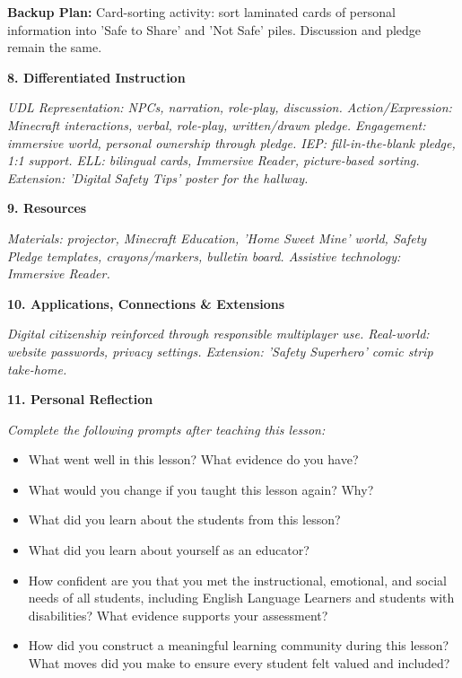 \documentclass[11pt,letterpaper]{article}
\begin{document}
\textbf{Backup Plan: }Card-sorting activity: sort laminated cards of personal information into 'Safe to Share' and 'Not Safe' piles. Discussion and pledge remain the same.

\textbf{8. Differentiated Instruction}

\textit{UDL Representation: NPCs, narration, role-play, discussion. Action/Expression: Minecraft interactions, verbal, role-play, written/drawn pledge. Engagement: immersive world, personal ownership through pledge. IEP: fill-in-the-blank pledge, 1:1 support. ELL: bilingual cards, Immersive Reader, picture-based sorting. Extension: 'Digital Safety Tips' poster for the hallway.}


\newpage
\textbf{9. Resources}

\textit{Materials: projector, Minecraft Education, 'Home Sweet Mine' world, Safety Pledge templates, crayons/markers, bulletin board. Assistive technology: Immersive Reader.}

\textbf{10. Applications, Connections \& Extensions}

\textit{Digital citizenship reinforced through responsible multiplayer use. Real-world: website passwords, privacy settings. Extension: 'Safety Superhero' comic strip take-home.}

\textbf{11. Personal Reflection}

\textit{Complete the following prompts after teaching this lesson:}

\begin{itemize}
  \item What went well in this lesson? What evidence do you have?

  \item What would you change if you taught this lesson again? Why?

  \item What did you learn about the students from this lesson?

  \item What did you learn about yourself as an educator?

  \item How confident are you that you met the instructional, emotional, and social needs of all students, including English Language Learners and students with disabilities? What evidence supports your assessment?

  \item How did you construct a meaningful learning community during this lesson? What moves did you make to ensure every student felt valued and included?
\end{itemize}
\end{document}

